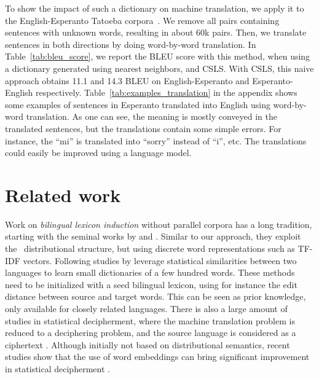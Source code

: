 \documentclass{article} \usepackage{iclr2018_conference,times}
\newcommand{\hub}{CSLS\xspace}
\begin{document}
To show the impact of such a dictionary on machine translation, we apply it to the English-Esperanto Tatoeba corpora~\citep{TIEDEMANN12.463}. We remove all pairs containing sentences with unknown words, resulting in about 60k pairs. Then, we translate sentences in both directions by doing word-by-word translation. In Table~\ref{tab:bleu_score}, we report the BLEU score with this method, when using a dictionary generated using nearest neighbors, and \hub. With \hub, this naive approach obtains 11.1 and 14.3 BLEU on English-Esperanto and Esperanto-English respectively. Table~\ref{tab:examples_translation} in the appendix shows some examples of sentences in Esperanto translated into English using word-by-word translation. 
As one can see, the meaning is mostly conveyed in the translated sentences, but the translations contain some simple errors. For instance, the ``mi'' is translated into ``sorry'' instead of ``i'', etc. The translations could easily be improved using a language model.

\insertwordsimscores
 \section{Related work}
\label{sec_related}
Work on \textit{bilingual lexicon induction} without parallel corpora has a long tradition, starting with the seminal works by \citet{Rapp1995} and \citet{fung1995compiling}. Similar to our approach, they exploit the~\citet{harris1954distributional} distributional structure, but using discrete word representations such as TF-IDF vectors. Following studies by \citet{Fung1998, Rapp1999, Schafer2002, koehn2002learning, haghighi2008learning, irvine2013supervised} leverage statistical similarities between two languages to learn small dictionaries of a few hundred words. These methods need to be initialized with a seed bilingual lexicon, using for instance the edit distance between source and target words. This can be seen as prior knowledge, only available for closely related languages. There is also a large amount of studies in statistical decipherment, where the machine translation problem is reduced to a deciphering problem, and the source language is considered as a ciphertext \citep{knight_acl11, knight17}. Although initially not based on distributional semantics, recent studies show that the use of word embeddings can bring significant improvement in statistical decipherment \citep{dou2015unifying}.
\end{document}
